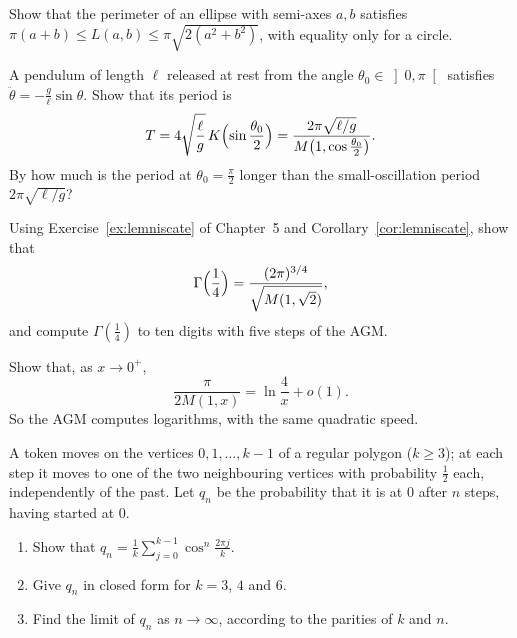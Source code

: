 \begin{exercise}[$\star$]\label{ex:eulerbounds}
Show that the perimeter of an ellipse with semi-axes $a,b$ satisfies $\pi(a+b)\le L(a,b)\le\pi\sqrt{2(a^2+b^2)}$, with equality only for a circle.
\end{exercise}

\begin{exercise}[$\star\star$]\label{ex:pendulum}
A pendulum of length $\ell$ released at rest from the angle $\theta_0\in\left]0,\pi\right[$ satisfies $\ddot\theta=-\frac g\ell\sin\theta$. Show that its period is
\[
T=4\sqrt{\frac\ell g}\,K\Bigl(\sin\frac{\theta_0}2\Bigr)=\frac{2\pi\sqrt{\ell/g}}{M\bigl(1,\cos\frac{\theta_0}2\bigr)}.
\]
By how much is the period at $\theta_0=\frac\pi2$ longer than the small-oscillation period $2\pi\sqrt{\ell/g}$?
\end{exercise}

\begin{exercise}[$\star\star$]\label{ex:gamma14}
Using Exercise~\ref{ex:lemniscate} of Chapter~5 and Corollary~\ref{cor:lemniscate}, show that
\[
\Gamma\Bigl(\frac14\Bigr)=\frac{(2\pi)^{3/4}}{\sqrt{M(1,\sqrt2)}},
\]
and compute $\Gamma(\frac14)$ to ten digits with five steps of the AGM.
\end{exercise}

\begin{exercise}[$\star\star\star$]\label{ex:agmlog}
Show that, as $x\to0^+$,
\[
\frac\pi{2M(1,x)}=\ln\frac4x+o(1).
\]
So the AGM computes logarithms, with the same quadratic speed.
\end{exercise}

\begin{exercise}[$\star$]\label{pb:cyclewalk}
A token moves on the vertices $0,1,\dots,k-1$ of a regular polygon ($k\ge3$); at each step it moves to one of the two
neighbouring vertices with probability $\frac12$ each, independently of the past. Let $q_n$ be the probability that it is at
$0$ after $n$ steps, having started at $0$.
\begin{enumerate}[label=(\alph*)]
\item Show that $q_n=\frac1k\sum_{j=0}^{k-1}\cos^n\frac{2\pi j}k$.
\item Give $q_n$ in closed form for $k=3$, $4$ and $6$.
\item Find the limit of $q_n$ as $n\to\infty$, according to the parities of $k$ and $n$.
\end{enumerate}
\end{exercise}

